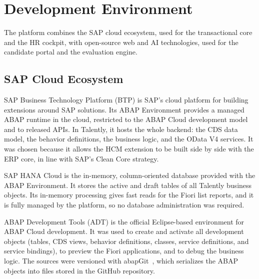 \newpage

\section{Development Environment}
\label{sec:dev_environment}

The platform combines the SAP cloud ecosystem, used for the transactional core and the HR cockpit, with open-source web and AI technologies, used for the candidate portal and the evaluation engine.

\subsection{SAP Cloud Ecosystem}
\label{subsec:sap_ecosystem}

SAP Business Technology Platform (BTP) is SAP's cloud platform for building extensions around SAP solutions. Its ABAP Environment provides a managed ABAP runtime in the cloud, restricted to the ABAP Cloud development model and to released APIs. In Talently, it hosts the whole backend: the CDS data model, the behavior definitions, the business logic, and the OData V4 services. It was chosen because it allows the HCM extension to be built side by side with the ERP core, in line with SAP's Clean Core strategy.

SAP HANA Cloud is the in-memory, column-oriented database provided with the ABAP Environment. It stores the active and draft tables of all Talently business objects. Its in-memory processing gives fast reads for the Fiori list reports, and it is fully managed by the platform, so no database administration was required.

ABAP Development Tools (ADT) is the official Eclipse-based environment for ABAP Cloud development. It was used to create and activate all development objects (tables, CDS views, behavior definitions, classes, service definitions, and service bindings), to preview the Fiori applications, and to debug the business logic. The sources were versioned with abapGit~\cite{abapgit}, which serializes the ABAP objects into files stored in the GitHub repository.

